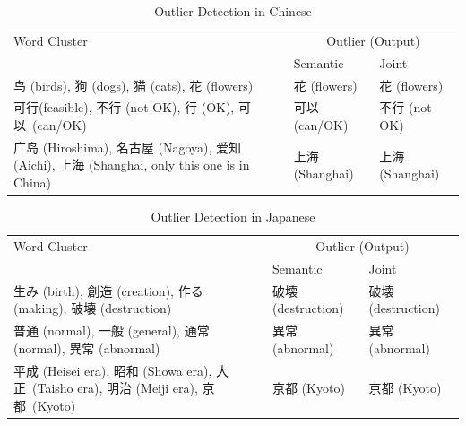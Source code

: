 \begin{table}[h]
    \centering
    \begin{CJK}{UTF8}{gbsn}
        \begin{tabularx}{\textwidth}{bll}
            \toprule
            \multirow{2.5}{*}{Word Cluster} & \multicolumn{2}{c}{Outlier (Output)} \\
            \cmidrule(lr){2-3} {} & Semantic & Joint \\\midrule

            鸟 (birds), 狗 (dogs), 猫 (cats), 花 (flowers) & \vspace{0.25cm} 花 (flowers) & 花 (flowers) \\

            可行(feasible), 不行 (not OK), 行 (OK), \mbox{可以}~(can/OK) & \vspace{0.25cm} 可以 (can/OK) & 不行 (not OK) \\

            \mbox{广岛} (Hiroshima), \mbox{名古屋} (Nagoya), \mbox{爱知}(Aichi), 上海 (Shanghai, only this one is in China) & 上海 (Shanghai) & 上海 (Shanghai)\\\bottomrule
        \end{tabularx}
    \end{CJK}
    \caption{Outlier Detection in Chinese}
    \label{tab:analysis_outlier1}
\end{table}

\begin{table}[h]
    \centering
    \begin{CJK}{UTF8}{ipxm}
        \begin{tabularx}{\textwidth}{bll}
            \toprule
            \multirow{2.5}{*}{Word Cluster} & \multicolumn{2}{c}{Outlier (Output)} \\
            \cmidrule(lr){2-3} {} & Semantic & Joint \\\midrule
            生み (birth), 創造 (creation), 作る (making), 破壊 (destruction) & \vspace{0.25cm} 破壊 (destruction) & 破壊 (destruction) \\
            普通 (normal), 一般 (general), 通常 (normal), 異常 (abnormal) & \vspace{0.25cm} 異常 (abnormal) & 異常 (abnormal) \\
            \mbox{平成} (Heisei era), \mbox{昭和} (Showa era), \mbox{大正}~(Taisho era), \mbox{明治} (Meiji era), \mbox{京都}~(\mbox{Kyoto}) & 京都 (Kyoto) & 京都 (Kyoto) \\\bottomrule
        \end{tabularx}
    \end{CJK}
    \caption{Outlier Detection in Japanese}
    \label{tab:analysis_outlier2}
\end{table}

